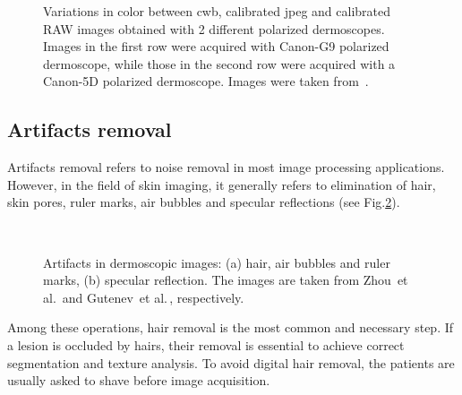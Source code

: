 \begin{figure}
\caption[Color variations between calibrated \ac{jpeg} and RAW images]{Variations in color between \Ac{cwb}, calibrated \ac{jpeg} and calibrated RAW images obtained with 2 different polarized dermoscopes. Images in the first row were acquired with Canon-G9 polarized dermoscope, while those in the second row were acquired with a Canon-5D polarized dermoscope. Images were taken from~\cite{Quintana2011}.}
\label{fig:Quintana2}
\end{figure}

\subsection{Artifacts removal} \label{subsec:artifactsremov}
Artifacts removal refers to noise removal in most image processing applications. 
However, in the field of skin imaging, it generally refers to elimination of hair, skin pores, ruler marks, air bubbles and specular reflections (see Fig.\ref{fig:artifacts}).
\begin{figure}
\centering
{}\
\caption[Artifacts in dermoscopic images]{Artifacts in dermoscopic images: (a) hair, air bubbles and ruler marks, (b) specular reflection. The images are taken from Zhou~et al.\,\cite{Zhou2008a} and Gutenev~et al.\,\cite{Gutenev2001}, respectively.}
\label{fig:artifacts}
\end{figure}
Among these operations, hair removal is the most common and necessary step.  
If a lesion is occluded by hairs, their removal is essential to achieve correct segmentation and texture analysis.
To avoid digital hair removal, the patients are usually asked to shave before image acquisition.

